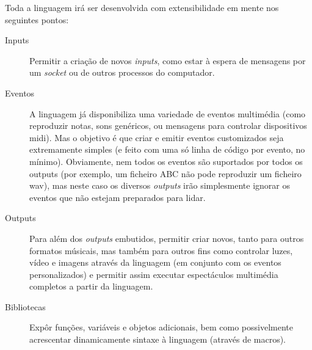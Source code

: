 \documentclass[
  oneside,
  11pt, a4paper,
  footinclude=true,
  headinclude=true,
  cleardoublepage=empty
]{scrbook}
\begin{document}
	Toda a linguagem irá ser desenvolvida com extensibilidade em mente nos seguintes pontos:
	\begin{description}
	 \item[Inputs] Permitir a criação de novos \textit{inputs}, como estar à espera de mensagens por um \textit{socket} ou de outros processos do computador.
	 \item[Eventos] A linguagem já disponibiliza uma variedade de eventos multimédia (como reproduzir notas, sons genéricos, ou mensagens para controlar dispositivos \acrshort{midi}). Mas o objetivo é que criar e emitir eventos customizados seja extremamente simples (e feito com uma só linha de código por evento, no mínimo). Obviamente, nem todos os eventos são suportados por todos os outputs (por exemplo, um ficheiro ABC não pode reproduzir um ficheiro \acrshort{wav}), mas neste caso os diversos \textit{outputs} irão simplesmente ignorar os eventos que não estejam preparados para lidar.
	 \item[Outputs] Para além dos \textit{outputs} embutidos, permitir criar novos, tanto para outros formatos músicais, mas também para outros fins como controlar luzes, vídeo e imagens através da linguagem (em conjunto com os eventos personalizados) e permitir assim executar espectáculos multimédia completos a partir da linguagem.
	 \item[Bibliotecas] Expôr funções, variáveis e objetos adicionais, bem como possivelmente acrescentar dinamicamente sintaxe à linguagem (através de macros).
	\end{description}
\end{document}
